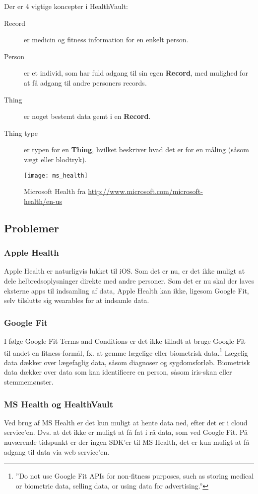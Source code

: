Der er 4 vigtige koncepter i HealthVault:
\begin{description}
\item[Record] er medicin og fitness information for en enkelt person.
\item[Person] er et individ, som har fuld adgang til sin egen \textbf{Record}, med mulighed for at få adgang til andre personers records.
\item[Thing] er noget bestemt data gemt i en \textbf{Record}.
\item[Thing type] er typen for en \textbf{Thing}, hvilket beskriver hvad det er for en måling (såsom vægt eller blodtryk).
\end{description}

\begin{figure}
\centering
\texttt{[image: ms\_health]}
\caption{Microsoft Health fra \url{http://www.microsoft.com/microsoft-health/en-us}}
\label{eksisterende_systemer:ms_health_fig}
\end{figure}

\subsection{Problemer}

\subsubsection{Apple Health}
Apple Health er naturligvis lukket til iOS.
Som det er nu, er det ikke muligt at dele helbredsoplysninger direkte med andre personer.
Som det er nu skal der laves eksterne apps til indsamling af data, Apple Health kan ikke, ligesom Google Fit, selv tilslutte sig wearables for at indsamle data.

\subsubsection{Google Fit}
I følge Google Fit Terms and Conditions er det ikke tilladt at bruge Google Fit til andet en fitness-formål, fx. at gemme lægelige eller biometrisk data.\footnote{''Do not use Google Fit APIs for non-fitness purposes, such as storing medical or biometric data, selling data, or using data for advertising.''}
Lægelig data dækker over lægefaglig data, såsom diagnoser og sygdomsforløb.
Biometrisk data dækker over data som kan identificere en person, såsom iris-skan eller stemmemønster.

\subsubsection{MS Health og HealthVault}
Ved brug af MS Health er det kun muligt at hente data ned, efter det er i cloud service'en.
Dvs. at det ikke er muligt at få fat i rå data, som ved Google Fit.
På nuværende tidspunkt er der ingen SDK'er til MS Health, det er kun muligt at få adgang til data via web service'en.
